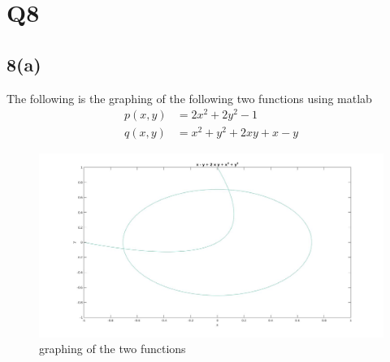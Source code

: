 \documentclass{article}
\begin{document}
\section{Q8}
\subsection{8(a)}
The following is the graphing of the following two functions using matlab
\begin{equation*}
\begin{aligned}
p(x,y) &= 2x^2 +2y^2 -1\\
q(x,y) &= x^2 + y^2 + 2xy + x - y
\end{aligned}
\end{equation*}
\begin{figure}[H]
\centering
\includegraphics[width=5in]{p8-1.jpg}
\caption{graphing of the two functions}
\end{figure}
\end{document}

